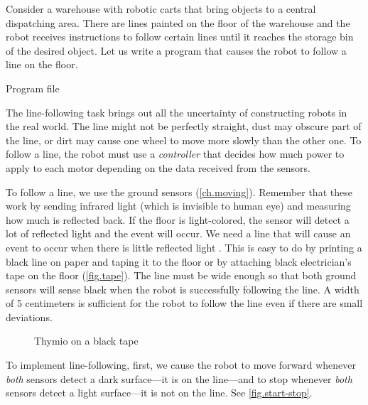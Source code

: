 
\label{ch.line}

Consider a warehouse with robotic carts that bring objects to a central
dispatching area. There are lines painted on the floor of the warehouse
and the robot receives instructions to follow certain lines until it
reaches the storage bin of the desired object. Let us write a program
that causes the robot to follow a line on the floor.

{\raggedleft \hfill Program file }

The line-following task brings out all the uncertainty of constructing
robots in the real world. The line might not be perfectly straight, dust
may obscure part of the line, or dirt may cause one wheel to move more
slowly than the other one. To follow a line, the robot must use a
\emph{controller} that decides how much power to apply to each motor
depending on the data received from the sensors.


To follow a line, we use the ground sensors (\cref{ch.moving}). Remember
that these work by sending infrared light (which is invisible to human
eye) and measuring how much is reflected back. If the floor is
light-colored, the sensor will detect a lot of reflected light and the
event  will occur. We need a line that will cause
an event to occur when there is little reflected light
. This is easy to do by printing a black line on
paper and taping it to the floor or by attaching black electrician's
tape on the floor (\cref{fig.tape}). The line must be wide enough so
that both ground sensors will sense black when the robot is successfully
following the line. A width of 5 centimeters is sufficient for the robot
to follow the line even if there are small deviations.

\begin{figure}
\hfill
{}
\caption{Thymio on a black tape}
\end{figure}

To implement line-following, first, we cause the robot to move forward
whenever \emph{both} sensors detect a dark surface---it is on the
line---and to stop whenever \emph{both} sensors detect a light
surface---it is not on the line. See \cref{fig.start-stop}.
                  
